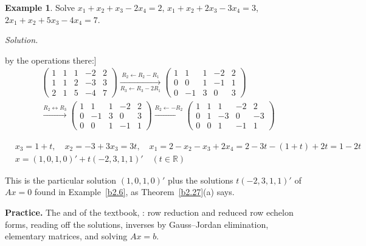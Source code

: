 \documentclass[12pt]{article}
\newcommand{\R}{\mathbb R}
\theoremstyle{definition}
\newtheorem{example}[theorem]{Example}
\newcommand{\boardtop}{\vspace*{-\abovedisplayskip}}
\begin{document}
\begin{example}\label{b2.29}
Solve \(x_1+x_2+x_3-2x_4=2\), \(x_1+x_2+2x_3-3x_4=3\), \(2x_1+x_2+5x_3-4x_4=7\).
\end{example}
\textit{Solution.}
\begin{board}[\(A\) of Example~\ref{b2.6}, \(b=(2,3,7)'\); forward elimination of \([A\mid b]\) by the operations
there:]
\[
\begin{gathered}
\left(\begin{array}{cccc|c}1&1&1&-2&2\\1&1&2&-3&3\\2&1&5&-4&7\end{array}\right)
\xrightarrow[R_3\leftarrow R_3-2R_1]{R_2\leftarrow R_2-R_1}
\left(\begin{array}{cccc|c}1&1&1&-2&2\\0&0&1&-1&1\\0&-1&3&0&3\end{array}\right)
\\
\xrightarrow{R_2\leftrightarrow R_3}
\left(\begin{array}{cccc|c}1&1&1&-2&2\\0&-1&3&0&3\\0&0&1&-1&1\end{array}\right)
\xrightarrow{R_2\leftarrow-R_2}
\left(\begin{array}{cccc|c}1&1&1&-2&2\\0&1&-3&0&-3\\0&0&1&-1&1\end{array}\right)
\end{gathered}
\]
\end{board}
\begin{board}[Echelon form, no row \((0\ 0\ 0\ 0\mid c)\), \(c\ne0\): consistent (Theorem~\ref{b2.26}); pivot columns
\(1,2,3\), \(x_4=t\) free: infinitely many solutions (Theorem~\ref{b2.27}(b)):]
\boardtop
\begin{align*}
&x_3=1+t,\quad x_2=-3+3x_3=3t,\quad x_1=2-x_2-x_3+2x_4=2-3t-(1+t)+2t=1-2t\\
&x=(1,0,1,0)'+t(-2,3,1,1)'\quad(t\in\R)
\end{align*}
\end{board}
This is the particular solution \((1,0,1,0)'\) plus the solutions \(t(-2,3,1,1)'\) of \(Ax=0\) found in
Example~\ref{b2.6}, as Theorem~\ref{b2.27}(a) says.

\bigskip
\textbf{Practice.} The  and  of the textbook, : row reduction and reduced row echelon forms,
reading off the solutions, inverses by Gauss--Jordan elimination, elementary matrices, and solving \(Ax=b\).
\end{document}
